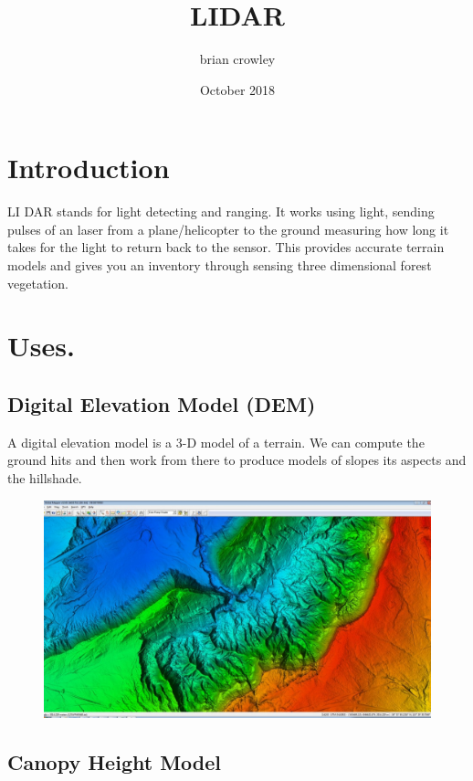 \documentclass{article}
\title{LIDAR}
\author{brian crowley }
\date{October 2018}
\begin{document}
\maketitle

\section{Introduction}
LI DAR stands for light detecting and ranging. It works using light, sending pulses of an laser from a plane/helicopter to the ground  measuring how long it takes for the light to return back to the sensor.
This provides accurate terrain models and gives you an inventory through sensing three dimensional forest vegetation. 

\section{Uses.}
\subsection{Digital Elevation Model (DEM)}
A digital elevation model is a 3-D model of a terrain. We can compute the ground hits and then work from there to produce models of slopes its aspects and the hillshade.
\begin{figure}[h!]
\centering
\includegraphics[width=\linewidth]{LIDAR.jpg}

\end{figure}
\subsection{Canopy Height Model}
\end{document}
